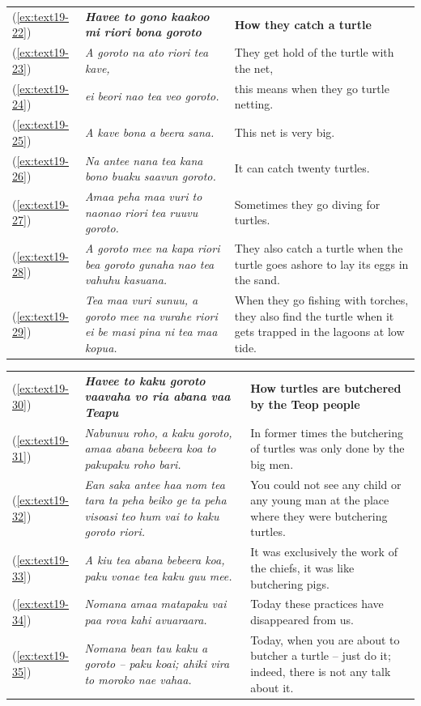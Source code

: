 \documentclass[output=paper]{langscibook}
\begin{document}
\begin{xltabular}{\textwidth}{lXX}
	(\ref{ex:text19-22})&\textit{\textbf{Havee to gono kaakoo mi riori bona goroto}}&\textbf{How they catch a turtle}\\
	(\ref{ex:text19-23})&\textit{A goroto na ato riori tea kave,}&They get hold of the turtle with the net,\\
	(\ref{ex:text19-24})&\textit{ei beori nao tea veo goroto.}&this means when they go turtle netting.\\
	(\ref{ex:text19-25})&\textit{A kave bona a beera sana.}&This net is very big.\\
	(\ref{ex:text19-26})&\textit{Na antee nana tea kana bono buaku saavun goroto.}&It can catch twenty turtles.\\
	(\ref{ex:text19-27})&\textit{Amaa peha maa vuri to naonao riori tea ruuvu goroto.}&Sometimes they go diving for turtles.\\
	(\ref{ex:text19-28})&\textit{A goroto mee na kapa riori bea goroto gunaha nao tea vahuhu kasuana.}&They also catch a turtle when the turtle goes ashore to lay its eggs in the sand.\\
	(\ref{ex:text19-29})&\textit{Tea maa vuri sunuu, a goroto mee na vurahe riori ei be masi pina ni tea maa kopua.}&When they go fishing with torches, they also find the turtle when it gets trapped in the lagoons at low tide.\\
\end{xltabular}
\begin{xltabular}{\textwidth}{lXX}
	(\ref{ex:text19-30})&\textit{\textbf{Havee to kaku goroto vaavaha vo ria abana vaa Teapu}}&\textbf{How turtles are butchered by the Teop people}\\
	(\ref{ex:text19-31})&\textit{Nabunuu roho, a kaku goroto, amaa abana bebeera koa to pakupaku roho bari.}&In former times the butchering of turtles was only done by the big men.\\
	(\ref{ex:text19-32})&\textit{Ean saka antee haa nom tea tara ta peha beiko ge ta peha visoasi teo hum vai to kaku goroto riori.}&You could not see any child or any young man at the place where they were butchering turtles.\\
	(\ref{ex:text19-33})&\textit{A kiu tea abana bebeera koa, paku vonae tea kaku guu mee.}&It was exclusively the work of the chiefs, it was like butchering pigs.\\
	(\ref{ex:text19-34})&\textit{Nomana amaa matapaku vai paa rova kahi avuaraara.}&Today these practices have disappeared from us.\\
	(\ref{ex:text19-35})&\textit{Nomana bean tau kaku a goroto -- paku koai; ahiki vira to moroko nae vahaa.}&Today, when you are about to butcher a turtle -- just do it; indeed, there is not any talk about it.\\
\end{xltabular}
\end{document}
